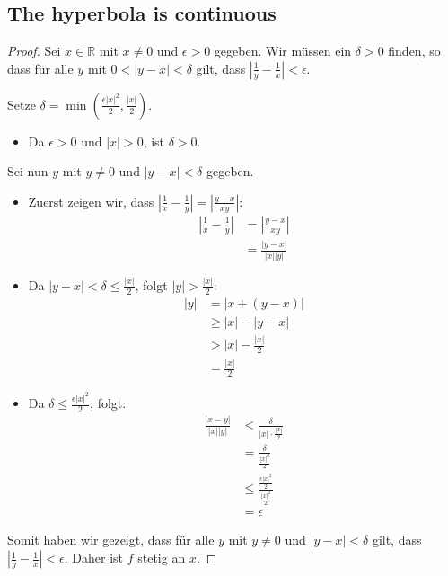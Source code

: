 \subsection{The hyperbola is continuous}


\begin{proof}
Sei \( x \in \mathbb{R} \) mit \( x \neq 0 \) und \( \epsilon > 0 \) gegeben. Wir müssen ein \( \delta > 0 \) finden, so dass für alle \( y \) mit \( 0 < |y - x| < \delta \) gilt, dass \( \left| \frac{1}{y} - \frac{1}{x} \right| < \epsilon \).

Setze \( \delta = \min \left( \frac{\epsilon |x|^2}{2}, \frac{|x|}{2} \right) \).

\begin{itemize}
    \item Da \( \epsilon > 0 \) und \( |x| > 0 \), ist \( \delta > 0 \).
\end{itemize}

Sei nun \( y \) mit \( y \neq 0 \) und \( |y - x| < \delta \) gegeben.

\begin{itemize}
    \item Zuerst zeigen wir, dass \( \left| \frac{1}{x} - \frac{1}{y} \right| = \left| \frac{y - x}{xy} \right| \):
    \begin{align*}
    \left| \frac{1}{x} - \frac{1}{y} \right| &= \left| \frac{y - x}{xy} \right| \\
    &= \frac{|y - x|}{|x||y|}
    \end{align*}

    \item Da \( |y - x| < \delta \leq \frac{|x|}{2} \), folgt \( |y| > \frac{|x|}{2} \):
    \begin{align*}
    |y| &= |x + (y - x)| \\
    &\geq |x| - |y - x| \\
    &> |x| - \frac{|x|}{2} \\
    &= \frac{|x|}{2}
    \end{align*}

    \item Da \( \delta \leq \frac{\epsilon |x|^2}{2} \), folgt:
    \begin{align*}
    \frac{|x - y|}{|x||y|} &< \frac{\delta}{|x| \cdot \frac{|x|}{2}} \\
    &= \frac{\delta}{\frac{|x|^2}{2}} \\
    &\leq \frac{\frac{\epsilon |x|^2}{2}}{\frac{|x|^2}{2}} \\
    &= \epsilon
    \end{align*}
\end{itemize}

Somit haben wir gezeigt, dass für alle \( y \) mit \( y \neq 0 \) und \( |y - x| < \delta \) gilt, dass \( \left| \frac{1}{y} - \frac{1}{x} \right| < \epsilon \). Daher ist \( f \) stetig an \( x \).
\end{proof}
